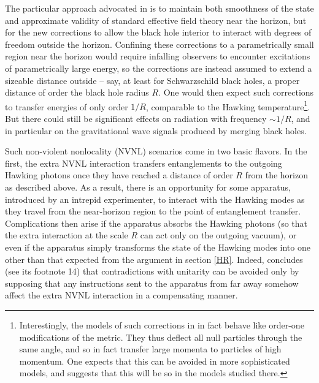 \documentclass[10pt]{article}
\begin{document}
The particular approach advocated in \cite{Giddings:2011ks,Giddings:2012gc,Giddings:2013kcj} is to maintain both smoothness of the state and approximate validity of standard effective field theory near the horizon, but for the new corrections to allow the black hole interior to interact with degrees of freedom outside the horizon.  Confining these corrections to a parametrically small region near the horizon would require infalling observers to encounter excitations of parametrically large energy, so the corrections are instead assumed to extend a sizeable distance outside -- say, at least for Schwarzschild black holes,  a proper distance of order the black hole radius $R$.  One would then expect such corrections to transfer energies of only order $1/R$, comparable to the Hawking temperature\footnote{Interestingly, the models of such corrections in \cite{Giddings:2014nla} in fact behave like order-one modifications of the metric.  They thus deflect all null particles through the same angle, and so in fact transfer large momenta to particles of high momentum. One expects that this can be avoided in more sophisticated models, and \cite{Giddings:2017mym} suggests that this will be so in the models studied there.}. But there could still be significant effects on radiation with frequency $\sim 1/R$, and in particular on the gravitational wave signals produced by merging black holes.

Such non-violent nonlocality (NVNL) scenarios come in two basic flavors.  In the first, the extra NVNL interaction transfers entanglements to the outgoing Hawking photons once they have reached a distance of order $R$ from the horizon as described above.  As a result, there is an opportunity for some apparatus, introduced by an intrepid experimenter, to interact with the Hawking modes as they travel from the near-horizon region to the point of entanglement transfer.  Complications then arise \cite{Almheiri:2012rt} if the apparatus absorbs the Hawking photons (so that the extra interaction at the scale $R$ can act only on the outgoing vacuum), or even \cite{Almheiri:2013hfa} if the apparatus simply transforms the state of the Hawking modes into one other than that expected from the argument in section \ref{HR}.   Indeed, \cite{Almheiri:2013hfa} concludes (see its footnote 14) that contradictions with unitarity can be avoided only by supposing that any instructions sent to the apparatus from far away somehow affect the extra NVNL interaction in a compensating manner.
\end{document}
